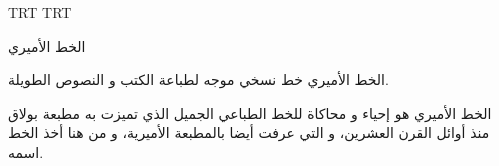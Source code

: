 \documentclass{article}
\begin{document}
\arab 
\startharfbuzz
{}

\luatextextdir TRT
\luatexpardir TRT

  الخط الأميري

  الخط الأميري خط نسخي موجه لطباعة الكتب و النصوص الطويلة.

  الخط الأميري هو إحياء و محاكاة للخط الطباعي الجميل الذي تميزت به مطبعة بولاق منذ أوائل القرن العشرين، و التي عرفت أيضا بالمطبعة الأميرية، و من هنا أخذ الخط اسمه.
\end{document}
